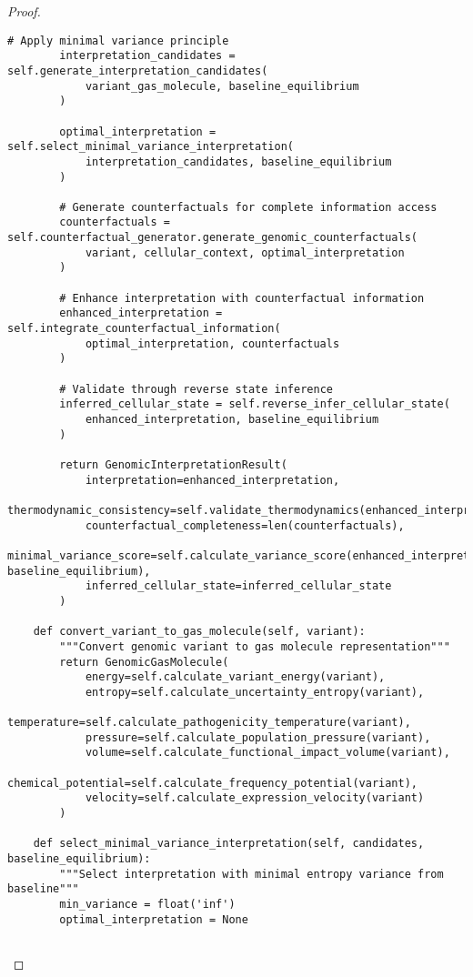\documentclass[12pt,a4paper]{article}
\begin{document}
\begin{proof}
\begin{lstlisting}[style=pythonstyle, caption=Gas Molecular Enhanced Genomic Processing]
        # Apply minimal variance principle
        interpretation_candidates = self.generate_interpretation_candidates(
            variant_gas_molecule, baseline_equilibrium
        )
        
        optimal_interpretation = self.select_minimal_variance_interpretation(
            interpretation_candidates, baseline_equilibrium
        )
        
        # Generate counterfactuals for complete information access
        counterfactuals = self.counterfactual_generator.generate_genomic_counterfactuals(
            variant, cellular_context, optimal_interpretation
        )
        
        # Enhance interpretation with counterfactual information
        enhanced_interpretation = self.integrate_counterfactual_information(
            optimal_interpretation, counterfactuals
        )
        
        # Validate through reverse state inference
        inferred_cellular_state = self.reverse_infer_cellular_state(
            enhanced_interpretation, baseline_equilibrium
        )
        
        return GenomicInterpretationResult(
            interpretation=enhanced_interpretation,
            thermodynamic_consistency=self.validate_thermodynamics(enhanced_interpretation),
            counterfactual_completeness=len(counterfactuals),
            minimal_variance_score=self.calculate_variance_score(enhanced_interpretation, baseline_equilibrium),
            inferred_cellular_state=inferred_cellular_state
        )
    
    def convert_variant_to_gas_molecule(self, variant):
        """Convert genomic variant to gas molecule representation"""
        return GenomicGasMolecule(
            energy=self.calculate_variant_energy(variant),
            entropy=self.calculate_uncertainty_entropy(variant),
            temperature=self.calculate_pathogenicity_temperature(variant),
            pressure=self.calculate_population_pressure(variant),
            volume=self.calculate_functional_impact_volume(variant),
            chemical_potential=self.calculate_frequency_potential(variant),
            velocity=self.calculate_expression_velocity(variant)
        )
    
    def select_minimal_variance_interpretation(self, candidates, baseline_equilibrium):
        """Select interpretation with minimal entropy variance from baseline"""
        min_variance = float('inf')
        optimal_interpretation = None
        

\end{lstlisting}
\end{proof}
\end{document}
